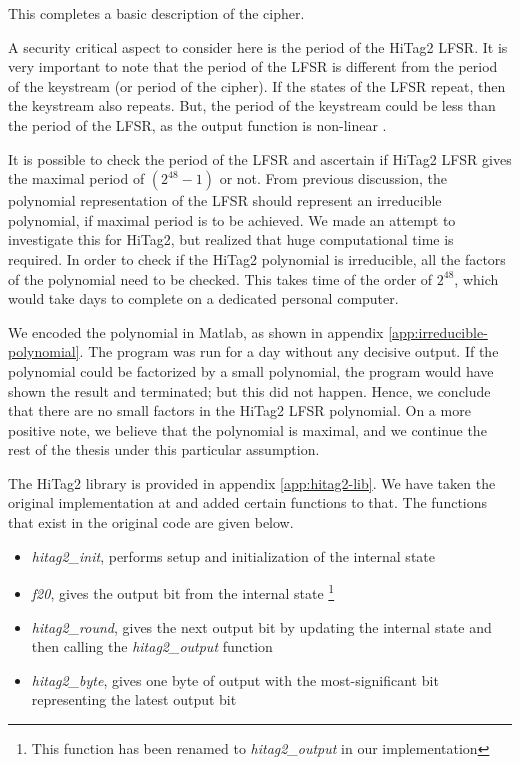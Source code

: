 This completes a basic description of the cipher. 

A security critical aspect to consider here is the period of the HiTag2 LFSR. It is very important to note that the period of the LFSR is different from the period of the keystream (or period of the cipher). If the states of the LFSR repeat, then the keystream also repeats. But, the period of the keystream could be less than the period of the LFSR, as the output function is non-linear \cite{erik-discussions}. 

It is possible to check the period of the LFSR and ascertain if HiTag2 LFSR gives the maximal period of $(2^{48} - 1)$ or not. From previous discussion, the polynomial representation of the LFSR should represent an irreducible polynomial, if maximal period is to be achieved. We made an attempt to investigate this for HiTag2, but realized that huge computational time is required. In order to check if the HiTag2 polynomial is irreducible, all the factors of the polynomial need to be checked. This takes time of the order of $2^{48}$, which would take days to complete on a dedicated personal computer.

We encoded the polynomial in Matlab, as shown in appendix \ref{app:irreducible-polynomial}. The program was run for a day without any decisive output. If the polynomial could be factorized by a small polynomial, the program would have shown the result and terminated; but this did not happen. Hence, we conclude that there are no small factors in the HiTag2 LFSR polynomial. On a more positive note, we believe that the polynomial is maximal, and we continue the rest of the thesis under this particular assumption.

The HiTag2 library is provided in appendix \ref{app:hitag2-lib}. We have taken the original implementation at \cite{hitag2-code} and added certain functions to that. The functions that exist in the original code are given below.
\begin{itemize}
\item \textit{hitag2\_init}, performs setup and initialization of the internal state
\item \textit{f20}, gives the output bit from the internal state \footnote{This function has been renamed to \textit{hitag2\_output} in our implementation}
\item \textit{hitag2\_round}, gives the next output bit by updating the internal state and then calling the \textit{hitag2\_output} function
\item \textit{hitag2\_byte}, gives one byte of output with the most-significant bit representing the latest output bit
\end{itemize}

